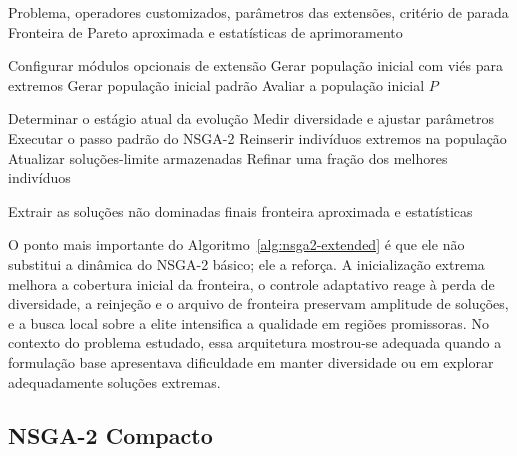 \begin{algoritmo}
    \caption{NSGA-2-Estendido para alocação de médicos}
    \label{alg:nsga2-extended}
    \begin{algorithmic}[1]
        \Require Problema, operadores customizados, parâmetros das extensões, critério de parada
        \Ensure Fronteira de Pareto aproximada e estatísticas de aprimoramento

        \State Configurar módulos opcionais de extensão
        \State Gerar população inicial com viés para extremos
        \Else
        \State Gerar população inicial padrão
        \EndIf
        \State Avaliar a população inicial $P$

        \State Determinar o estágio atual da evolução
        \State Medir diversidade e ajustar parâmetros
        \EndIf
        \State Executar o passo padrão do NSGA-2
        \State Reinserir indivíduos extremos na população
        \EndIf
        \State Atualizar soluções-limite armazenadas
        \EndIf
        \State Refinar uma fração dos melhores indivíduos
        \EndIf
        \EndWhile

        \State Extrair as soluções não dominadas finais
        \State \Return fronteira aproximada e estatísticas
    \end{algorithmic}
\end{algoritmo}

O ponto mais importante do Algoritmo~\ref{alg:nsga2-extended} é que ele não substitui a dinâmica do NSGA-2 básico; ele a reforça. A inicialização extrema melhora a cobertura inicial da fronteira, o controle adaptativo reage à perda de diversidade, a reinjeção e o arquivo de fronteira preservam amplitude de soluções, e a busca local sobre a elite intensifica a qualidade em regiões promissoras. No contexto do problema estudado, essa arquitetura mostrou-se adequada quando a formulação base apresentava dificuldade em manter diversidade ou em explorar adequadamente soluções extremas.

\subsection{NSGA-2 Compacto}
\label{subsec:nsga2-compact}

